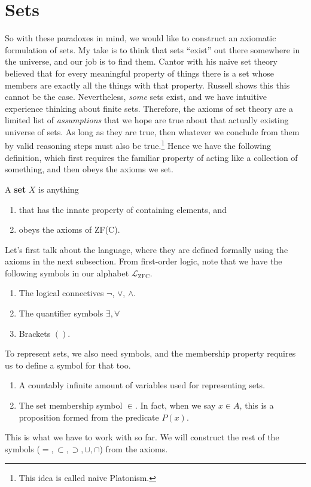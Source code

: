 \section{Sets} 

  So with these paradoxes in mind, we would like to construct an axiomatic formulation of sets. My take is to think that sets ``exist'' out there somewhere in the universe, and our job is to find them. Cantor with his naive set theory believed that for every meaningful property of things there is a set whose members are exactly all the things with that property. Russell shows this this cannot be the case. Nevertheless, \textit{some} sets exist, and we have intuitive experience thinking about finite sets. Therefore, the axioms of set theory are a limited list of \textit{assumptions} that we hope are true about that actually existing universe of sets. As long as they are true, then whatever we conclude from them by valid reasoning steps must also be true.\footnote{This idea is called naive Platonism.} Hence we have the following definition, which first requires the familiar property of acting like a collection of something, and then obeys the axioms we set. 
  
  \begin{definition}[Set]
    \label{def:set}
    A \textbf{set} $X$ is anything 
    \begin{enumerate}
      \item that has the innate property of containing elements, and 
      \item obeys the axioms of ZF(C). 
    \end{enumerate}
  \end{definition}  

  Let's first talk about the language, where they are defined formally using the axioms in the next subsection. From first-order logic, note that we have the following symbols in our alphabet $\mathcal{L}_{\mathrm{ZFC}}$. 
  \begin{enumerate}
    \item The logical connectives $\neg$, $\lor$, $\land$. 
    \item The quantifier symbols $\exists, \forall$ 
    \item Brackets $()$. 
  \end{enumerate}
  To represent sets, we also need symbols, and the membership property requires us to define a symbol for that too. 
  \begin{enumerate}
    \item A countably infinite amount of variables used for representing sets. 
    \item The set membership symbol $\in$. In fact, when we say $x \in A$, this is a proposition formed from the predicate $P(x)$. 
  \end{enumerate} 
  This is what we have to work with so far. We will construct the rest of the symbols ($=, \subset, \supset, \cup, \cap$) from the axioms. 

